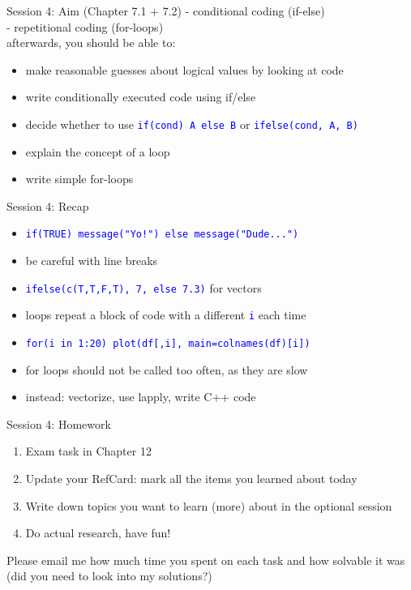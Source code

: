 \documentclass[xcolor=table,       handout,    xcolor=dvipsnames]{beamer}\usepackage[]{graphicx}\usepackage[]{color}
\newcommand{\rcode}[1]{\texttt{\textcolor{Blue}{#1}}} %
\begin{document}
\begin{frame}{Session 4: Aim (Chapter 7.1 + 7.2)}
\pause - conditional coding (if-else)\\
\pause - repetitional coding (for-loops)\\
\pause afterwards, you should be able to:
\pause
\begin{itemize}[<+->]
\item make reasonable guesses about logical values by looking at code
\item write conditionally executed code using if/else
\item decide whether to use \rcode{if(cond) A else B} or \rcode{ifelse(cond, A, B)}
\item explain the concept of a loop
\item write simple for-loops
\end{itemize}
\end{frame}


\begin{frame}[fragile]{Session 4: Recap}
\begin{itemize}[<+->]
\item \rcode{if(TRUE) message("Yo!") else message("Dude...")}
\item be careful with line breaks
\item \rcode{ifelse(c(T,T,F,T), 7, else 7.3)} for vectors
\item loops repeat a block of code with a different \rcode{i} each time
\item \rcode{for(i in 1:20) plot(df[,i], main=colnames(df)[i])}
\item for loops should not be called too often, as they are slow
\item instead: vectorize, use lapply, write C++ code
\end{itemize}
\end{frame}


\begin{frame}{Session 4: Homework }
\begin{enumerate}[<+->]
  \item Exam task in Chapter 12
  \item Update your RefCard: mark all the items you learned about today
  \item Write down topics you want to learn (more) about in the optional session
  \item Do actual research, have fun!
\end{enumerate}
\onslide<+->
Please email me how much time you spent on each task and how solvable it was (did you need to look into my solutions?)
\end{frame}
\end{document}
